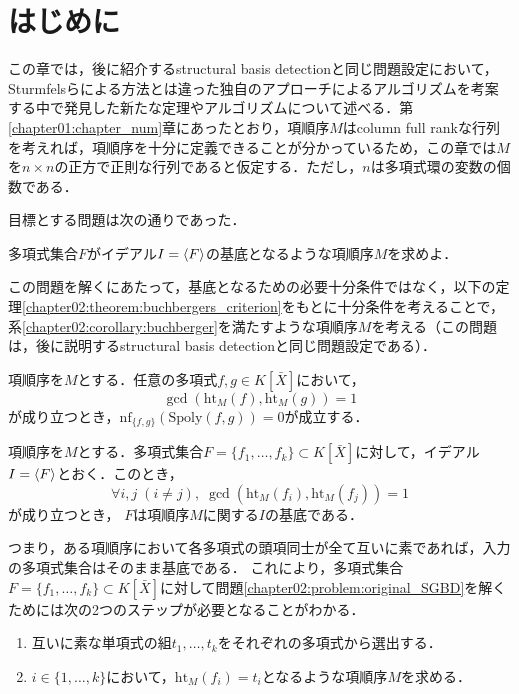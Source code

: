 \section{はじめに}
この章では，後に紹介するstructural \groebner{} basis detectionと同じ問題設定において，Sturmfelsらによる方法とは違った独自のアプローチによるアルゴリズムを考案する中で発見した新たな定理やアルゴリズムについて述べる．第\ref{chapter01:chapter_num}章にあったとおり，項順序$M$はcolumn full rankな行列を考えれば，項順序を十分に定義できることが分かっているため，この章では$M$を$n \times n$の正方で正則な行列であると仮定する．ただし，$n$は多項式環の変数の個数である．
\par
目標とする問題は次の通りであった．
\begin{problem}
	\label{chapter02:problem:original_SGBD}
	多項式集合$F$がイデアル$I = \langle F \rangle$の\groebner{}基底となるような項順序$M$を求めよ．
\end{problem}
この問題を解くにあたって，\groebner{}基底となるための必要十分条件ではなく，以下の定理\ref{chapter02:theorem:buchbergers_criterion}をもとに十分条件を考えることで，系\ref{chapter02:corollary:buchberger}を満たすような項順序$M$を考える（この問題は，後に説明するstructural \groebner{} basis detectionと同じ問題設定である）．
\begin{theorem}[Buchbergerの判定条件]
	\label{chapter02:theorem:buchbergers_criterion}
	項順序を$M$とする．任意の多項式$f, g \in K[\bar{X}]$において，$$\gcd(\mathrm{ht}_M(f), \mathrm{ht}_M(g))=1$$が成り立つとき，$\mathrm{nf}_{\{f, g\}}(\mathrm{Spoly}(f, g)) = 0$が成立する．
	\end{theorem}
	\begin{corollary}
	\label{chapter02:corollary:buchberger}
	項順序を$M$とする．多項式集合$F=\{ f_1, \dots, f_k \} \subset K[\bar{X}]$に対して，イデアル$I = \langle F \rangle$とおく．このとき，
	$$\forall i, j \; (i \ne j), \; \gcd(\mathrm{ht}_M(f_i), \mathrm{ht}_M(f_j))=1$$
	が成り立つとき， $F$は項順序$M$に関する$I$の\groebner{}基底である．
\end{corollary}
つまり，ある項順序において各多項式の頭項同士が全て互いに素であれば，入力の多項式集合はそのまま\groebner{}基底である．
これにより，多項式集合$F = \{f_1, \dots, f_k\}\subset K[\bar{X}]$に対して問題\ref{chapter02:problem:original_SGBD}を解くためには次の2つのステップが必要となることがわかる．
\par
\begin{enumerate}
	\item 互いに素な単項式の組$t_1, \dots, t_k$をそれぞれの多項式から選出する．
	\item $i \in \{1, \dots, k\}$において，$\mathrm{ht}_M(f_i) = t_i$となるような項順序$M$を求める．
\end{enumerate}




